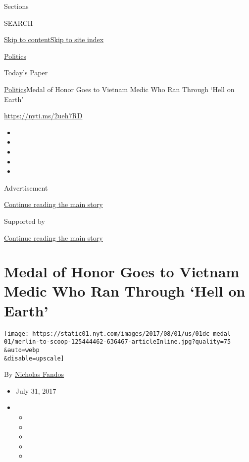 Sections

SEARCH

\protect\hyperlink{site-content}{Skip to
content}\protect\hyperlink{site-index}{Skip to site index}

\href{https://www.nytimes.com/section/politics}{Politics}

\href{https://myaccount.nytimes.com/auth/login?response_type=cookie\&client_id=vi}{}

\href{https://www.nytimes.com/section/todayspaper}{Today's Paper}

\href{/section/politics}{Politics}\textbar{}Medal of Honor Goes to
Vietnam Medic Who Ran Through `Hell on Earth'

\url{https://nyti.ms/2ueh7RD}

\begin{itemize}
\item
\item
\item
\item
\item
\end{itemize}

Advertisement

\protect\hyperlink{after-top}{Continue reading the main story}

Supported by

\protect\hyperlink{after-sponsor}{Continue reading the main story}

\hypertarget{medal-of-honor-goes-to-vietnam-medic-who-ran-through-hell-on-earth}{%
\section{Medal of Honor Goes to Vietnam Medic Who Ran Through `Hell on
Earth'}\label{medal-of-honor-goes-to-vietnam-medic-who-ran-through-hell-on-earth}}

\texttt{[image: https://static01.nyt.com/images/2017/08/01/us/01dc-medal-01/merlin-to-scoop-125444462-636467-articleInline.jpg?quality=75\\\&auto=webp\\\&disable=upscale]}

By \href{https://www.nytimes.com/by/nicholas-fandos}{Nicholas Fandos}

\begin{itemize}
\item
  July 31, 2017
\item
  \begin{itemize}
  \item
  \item
  \item
  \item
  \item
  \end{itemize}
\end{itemize}

